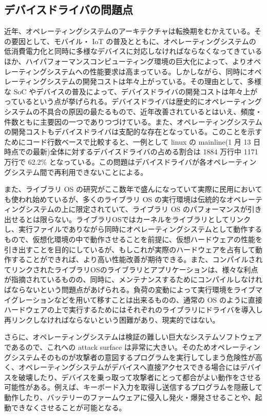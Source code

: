 \documentclass[a4paper,11pt,report]{ltjsbook}
\begin{document}
\subsection{デバイスドライバの問題点}
近年、オペレーティングシステムのアーキテクチャは転換期をむかえている。その要因として、モバイル・ IoT の普及とともに、オペレーティングシステムの低消費電力化と同時に多様なデバイスに対応しなければならなくなってきているほか、ハイパフォーマンスコンピューティング環境の巨大化によって、よりオペレーティングシステムへの性能要求は高まっている。しかしながら、同時にオペレーティングシステムの開発コストは年々上がっている。その理由として、多様な SoC やデバイスの普及によって、デバイスドライバの開発コストは年々上がっているという点が挙げられる。デバイスドライバは歴史的にオペレーティングシステムの不具合の原因の最たるもので\cite{oserrors}、近年改善されているとはいえ、頻度・件数ともに主要因の一つでありつづけている\cite{faults}。また、オペレーティングシステムの開発コストもデバイスドライバは支配的な存在となっている。このことを示すためにコード行数ベースで比較すると、一例として linux の mainline(1 月 13 日時点での最新)全体に対するデバイスドライバの占める割合は 1884 万行中 1171 万行で 62.2\% となっている。この問題はデバイスドライバが各オペレーティングシステム間で再利用できないことによる。

また、ライブラリ OS の研究がここ数年で盛んになっていて実際に民用においても使われ始めているが、多くのライブラリ OS の実行環境は伝統的なオペレーティングシステムの上に限定されていて、ライブラリ OS のパフォーマンスが引き出せるとは限らない。ライブラリOSではカーネルをライブラリとしてリンクし、実行ファイルでありながら同時にオペレーティングシステムとして動作するもので、仮想化環境の中で動作させることを前提に、仮想ハードウェアの性能を引き出すことを目的にしているが、もしこれが実際のハードウェアを占有して動作することができれば、より高い性能改善が期待できる。また、コンパイルされてリンクされたライブラリOSのライブラリとアプリケーションは、様々な利点が指摘されているものの、同時に、メンテナンスするためにコンパイルしなければならないという問題点があげられる。負荷の変動によって実行環境をライブマイグレーション\cite{livemgrt}などを用いて移すことは出来るものの、通常の OS のように直接ハードウェアの上で実行するためにはそれぞれのライブラリにドライバを導入し再リンクしなければならないという困難があり、現実的ではない。%

さらに、オペレーティングシステムは検証の難しい巨大なシステムソフトウェアであるので、これへの attack surface は非常に大きい。そのためオペレーティングシステムそのものが攻撃者の意図するプログラムを実行してしまう危険性が高く、オペレーティングシステムがデバイスへ直接アクセスできる場合にはデバイスを破壊したり、デバイスを乗っ取って攻撃者にとって都合がよい動作をさせる可能性がある。例えば、キーボード入力を取得し送信するプログラムを隠蔽して動作したり\cite{thinkpadkeyvlnt}、バッテリーのファームウェアに侵入し発火・爆発させることや\cite{macbookbatvlnt}、起動できなくさせること\cite{takekoshinvmvlnt}が可能となる。
\end{document}
